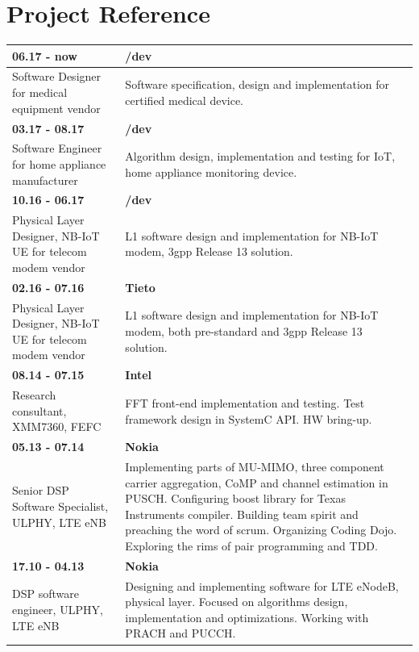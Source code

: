\documentclass{report}
\begin{document}
\section{Project Reference}
\begin{longtable}{p{5cm} p{10cm}}
	\textbf{06.17 - now} &\textbf{/dev}\\
	\hline
	Software Designer for medical equipment vendor
	&Software specification, design and implementation for certified medical device.\\

	\textbf{03.17 - 08.17} &\textbf{/dev}\\
	\hline
	Software Engineer for home appliance manufacturer
	&Algorithm design, implementation and testing for IoT, home appliance monitoring device.\\

	\textbf{10.16 - 06.17} &\textbf{/dev}\\
	\hline
	Physical Layer Designer, NB-IoT UE for telecom modem vendor
	&L1 software design and implementation for NB-IoT modem, 3gpp Release 13 solution.\\

	\textbf{02.16 - 07.16} &\textbf{Tieto}\\
	\hline
	Physical Layer Designer, NB-IoT UE for telecom modem vendor
	&L1 software design and implementation for NB-IoT modem, both pre-standard and
	3gpp Release 13 solution.\\

	\textbf{08.14 - 07.15} &\textbf{Intel}\\
	\hline
	Research consultant, XMM7360, FEFC
	&FFT front-end implementation and testing. Test framework design in SystemC
	API. HW bring-up.\\

	\textbf{05.13 - 07.14} &\textbf{Nokia}\\
	\hline
	Senior DSP Software Specialist, ULPHY, LTE eNB
	&Implementing parts of MU-MIMO, three component carrier aggregation, CoMP
	and channel estimation in PUSCH. Configuring boost library for Texas
	Instruments compiler. Building team spirit and preaching the word of scrum.
	Organizing Coding Dojo. Exploring the rims of pair programming and TDD.\\

	\textbf{17.10 - 04.13} &\textbf{Nokia}\\
	\hline
	DSP software engineer, ULPHY, LTE eNB
	&Designing and implementing software for LTE eNodeB, physical layer.
	Focused on algorithms design, implementation and optimizations. Working with
	PRACH and PUCCH.\\
\end{longtable}
\end{document}
